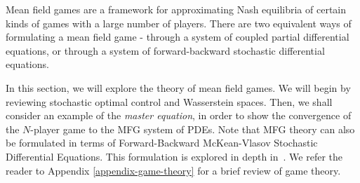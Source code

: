

Mean field games are a framework for approximating Nash equilibria of certain kinds of games with a large number of players.
There are two equivalent ways of formulating a mean field game - through a system of coupled partial differential equations, or through a system of forward-backward stochastic differential equations.

In this section, we will explore the theory of mean field games.
We will begin by reviewing stochastic optimal control and Wasserstein spaces. Then, we shall consider an example of the \textit{master equation}, in order to show the convergence of the $N$-player game to the MFG system of PDEs.
Note that MFG theory can also be formulated in terms of Forward-Backward McKean-Vlasov Stochastic Differential Equations. This formulation is explored in depth in~\cite{carmona2018probabilistic}.
We refer the reader to Appendix \ref{appendix-game-theory} for a brief review of game theory.

